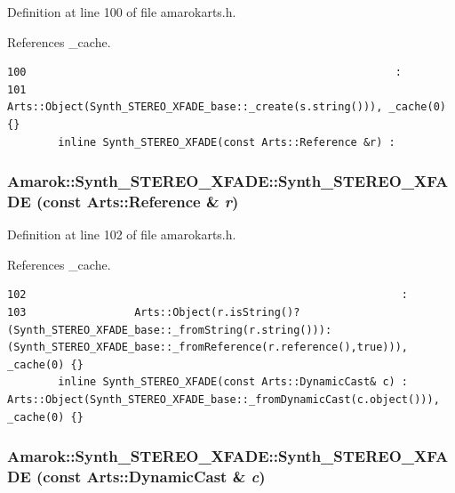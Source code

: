 Definition at line 100 of file amarokarts.h.

References \_\-cache.



\footnotesize\begin{verbatim}100                                                          :
101                 Arts::Object(Synth_STEREO_XFADE_base::_create(s.string())), _cache(0) {}
        inline Synth_STEREO_XFADE(const Arts::Reference &r) :
\end{verbatim}\normalsize 
{}
\subsubsection{\setlength{\rightskip}{0pt plus 5cm}Amarok::Synth\_\-STEREO\_\-XFADE::Synth\_\-STEREO\_\-XFADE (const Arts::Reference \& {\em r})\hspace{0.3cm}{\tt  [inline]}}\label{classAmarok_1_1Synth__STEREO__XFADE_Amarok_1_1Synth__STEREO__XFADEa2}




Definition at line 102 of file amarokarts.h.

References \_\-cache.



\footnotesize\begin{verbatim}102                                                           :
103                 Arts::Object(r.isString()?(Synth_STEREO_XFADE_base::_fromString(r.string())):(Synth_STEREO_XFADE_base::_fromReference(r.reference(),true))), _cache(0) {}
        inline Synth_STEREO_XFADE(const Arts::DynamicCast& c) : Arts::Object(Synth_STEREO_XFADE_base::_fromDynamicCast(c.object())), _cache(0) {}
\end{verbatim}\normalsize 
{}
\subsubsection{\setlength{\rightskip}{0pt plus 5cm}Amarok::Synth\_\-STEREO\_\-XFADE::Synth\_\-STEREO\_\-XFADE (const Arts::Dynamic\-Cast \& {\em c})\hspace{0.3cm}{\tt  [inline]}}\label{classAmarok_1_1Synth__STEREO__XFADE_Amarok_1_1Synth__STEREO__XFADEa3}




